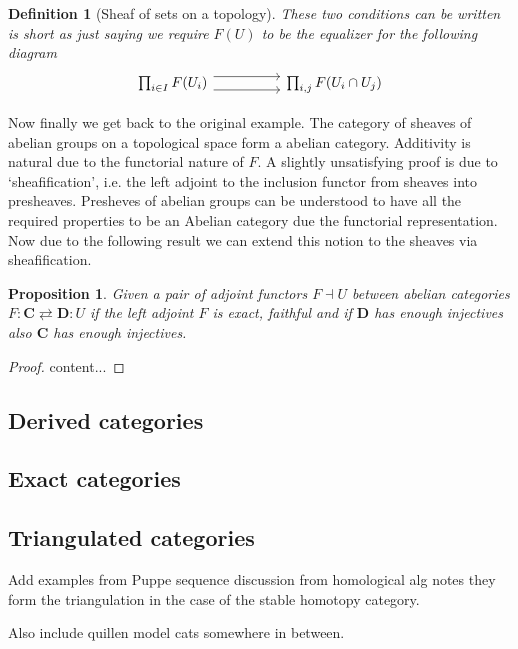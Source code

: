 \documentclass[12pt]{article}
\numberwithin{equation}{section}
\newtheorem{definition}{Definition}[section]
\newtheorem{proposition}{Proposition}[section]
\begin{document}
\begin{appendices}
\begin{enumerate}
\begin{definition}[Sheaf of sets on a topology]
			These two conditions can be written is short as just saying we require $F(U)$ to be the equalizer for the following diagram
			\[\begin{tikzcd}
				{\prod_{i \in I} F(U_i)} && {\prod_{i,j}F(U_i \cap U_j)}
				\arrow[shift right=2, from=1-1, to=1-3]
				\arrow[shift left=2, from=1-1, to=1-3]
			\end{tikzcd}\]
		\end{definition}
		
		Now finally we get back to the original example. The category of sheaves of abelian groups on a topological space form a abelian category. Additivity is natural due to the functorial nature of $F$. A slightly unsatisfying proof is due to `sheafification', i.e. the left adjoint to the inclusion functor from sheaves into presheaves. Presheves of abelian groups can be understood to have all the required properties to be an Abelian category due the functorial representation. Now due to the following result \cite{stacks1} we can extend this notion to the sheaves via sheafification.
	\end{enumerate}
	
	
	
	\begin{proposition}\label{adjointinjective}
		Given a pair of adjoint functors $F \dashv U$ between abelian categories $F:\mathbf{C} \rightleftarrows \mathbf{D}:U$ if the left adjoint $F$ is exact, faithful and if $ \mathbf{D}$ has enough injectives also $\mathbf{C}$ has enough injectives.
	\end{proposition}
	\begin{proof}
		content...
	\end{proof}
	\subsection{Derived categories}
	\subsection{Exact categories}
	\subsection{Triangulated categories}
	Add examples from Puppe sequence discussion from homological alg notes they form the triangulation in the case of the stable homotopy category.
	
	Also include quillen model cats somewhere in between.
	\end{appendices}
	
	
	\appendix
	
	
	
	
	
	
\end{document}
